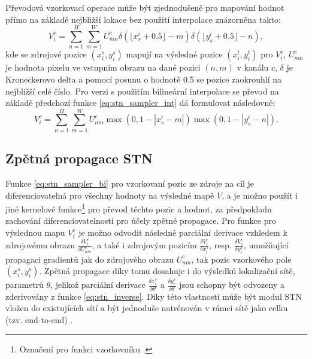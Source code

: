 Převodová vzorkovací operace může být zjednodušeně pro mapování hodnot přímo na základě nejbližší lokace bez použití interpolace znázorněna takto:
\begin{equation}
    V_i^c = \sum_{n=1}^{H} \sum_{m=1}^{W} U_{nm}^c \delta(\lfloor x_s^i + 0.5 \rfloor - m) \delta(\lfloor y_s^i + 0.5 \rfloor - n),
\label{eq:stn_sampler_int}
\end{equation}
kde se zdrojové pozice $(x_i^s, y_i^s)$ mapují na výsledné pozice $(x_i^t, y_i^t)$ pro $V_i^c$, $U_{nm}^c$ je hodnota pixelu ve vstupním obrazu na dané pozici $(n, m)$ v kanálu $c$, $\delta$ je Kroneckerovo delta a pomocí posunu o hodnotě 0.5 se pozice zaokrouhlí na nejbližší celé číslo. Pro verzi s použitím bilineární interpolace se převod na základě předchozí funkce \ref{eq:stn_sampler_int} dá formulovat následovně:
\begin{equation}
    V_i^c = \sum_{n=1}^{H} \sum_{m=1}^{W} U_{nm}^c \max(0, 1 - |x_s^i - m|) \max(0, 1 - |y_s^i - n|).
\label{eq:stn_sampler_bi}
\end{equation}

\subsection{Zpětná propagace STN}

Funkce \ref{eq:stn_sampler_bi} pro vzorkovaní pozic ze zdroje na cíl je diferenciovatelná pro všechny hodnoty na výsledné mapě $V$, a je možno použít i jiné kernelové funkce\footnote{Označení pro funkci vzorkovníku \cite{stn}.} pro převod těchto pozic a hodnot, za předpokladu zachování diferenciovatelnosti pro účely zpětné propagace. Pro funkce pro výslednou mapu $V_i^c$ je možno odvodit následné parciální derivace vzhledem k zdrojovému obrazu $\frac{\delta V_i^c}{\delta U_{nm}^c}$, a také i zdrojovým pozicím $\frac{\delta V_i^c}{\delta x_i^s}$, resp. $\frac{\delta V_i^c}{\delta y_i^s}$, umožňující propagaci gradientů jak do zdrojového obrazu $U_{nm}^c$, tak pozic vzorkového pole $(x_i^s, y_i^s)$. Zpětná propagace díky tomu dosahuje i do výsledků lokalizační sítě, parametrů $\theta$, jelikož parciální derivace $\frac{\delta x_i^s}{\delta \theta}$ a $\frac{\delta y_i^s}{\delta \theta}$ jsou schopny být odvozeny a zderivovány z funkce \ref{eq:stn_inverse}. Díky této vlastnosti může být modul STN vložen do existujících sítí a být jednoduše natrénován v rámci sítě jako celku (tzv. end-to-end) \cite{stn}. 
\endinput